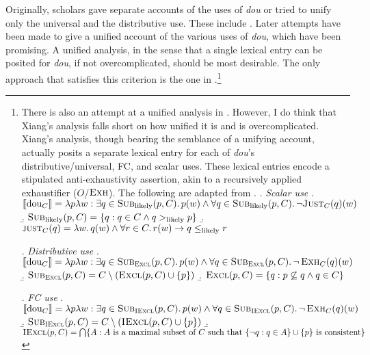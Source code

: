 \documentclass[12pt]{article}
\renewcommand{\setminus}{\mathbin{\backslash}}%
\DeclareMathOperator{\xh}{\textsc{Exh}}
\newcommand{\exh}{\ensuremath{\xh}}
\begin{document}
Originally, scholars gave separate accounts of the uses of \emph{dou} or tried to unify only the universal and the distributive use.
These include \citet{linDistributivityChineseIts1998,chengDouquantification1995,chengEveryTypeQuantificational2009}.
Later attempts have been made to give a unified account of the various uses of \emph{dou}, which have been promising.
A unified analysis, in the sense that a single lexical entry can be posited for \emph{dou}, if not overcomplicated, should be most desirable.
The only approach that satisfies this criterion is the one in \citet{liuVarietiesAlternativesMandarin2017,liuPragmaticExplanationMeidou2021}.\footnote{
  There is also an attempt at a unified analysis in \citet{xiangFunctionAlternationsMandarin2020}.
  However, I do think that Xiang's analysis falls short on how unified it is and is overcomplicated. Xiang's analysis, though bearing the semblance of a unifying account, actually posits a separate lexical entry for each of \emph{dou}'s distributive/universal, FC, and scalar uses.
  These lexical entries encode a stipulated anti-exhaustivity assertion, akin to a recursively applied exhaustifier (\(O\)/\(\exh\)).
  The following are adapted from \citet{xiangFunctionAlternationsMandarin2020}.
  \ex. \emph{Scalar use}
  \a. \(\llbracket \text{dou}_C \rrbracket = \lambda p \lambda w: \exists q \in \textsc{Sub}_{\text{likely}}(p, C).\, p(w) \land \forall q \in \textsc{Sub}_{\text{likely}}(p, C).\, \lnot \textsc{Just}_C(q)(w)\)
  \b. \(\textsc{Sub}_{\text{likely}}(p, C) = \{ q : q \in C \land q >_{\text{likely}} p \}\)
  \b. \(\textsc{just}_C(q) = \lambda w.\, q(w) \land \forall r \in C.\, r(w) \to q \leq_{\text{likely}} r \)

  \ex. \emph{Distributive use}
  \a. \(\llbracket \text{dou}_C \rrbracket = \lambda p \lambda w : \exists q \in \textsc{Sub}_{\textsc{Excl}}(p, C).\, p(w) \land \forall q \in \textsc{Sub}_{\textsc{Excl}}(p, C).\, \lnot \exh_C(q)(w)\)
  \b. \(\textsc{Sub}_{\textsc{Excl}}(p, C) = C \setminus (\textsc{Excl}(p, C) \cup \{ p \})\)
  \b. \(\textsc{Excl}(p, C) = \{ q : p \not \subseteq q \land q \in C \}\)

  \ex. \emph{FC use}
  \a. \(\llbracket \text{dou}_C \rrbracket = \lambda p \lambda w : \exists q \in \textsc{Sub}_{\textsc{IExcl}}(p, C).\, p(w) \land \forall q \in \textsc{Sub}_{\textsc{IExcl}}(p, C).\, \lnot \exh_C(q)(w) \)
  \b. \(\textsc{Sub}_{\textsc{IExcl}}(p, C) = C \setminus (\textsc{IExcl}(p, C) \cup \{ p \})\)
  \b. \(\textsc{IExcl}(p, C) = \bigcap \{ A : A \text{ is a maximal subset of } C \text{ such that } \{ \lnot q : q \in A \} \cup \{ p \} \text{ is consistent} \} \)

}
\end{document}
